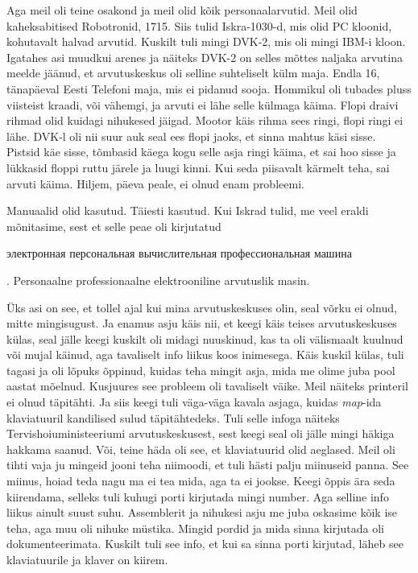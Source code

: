 Aga meil oli teine osakond ja meil olid kõik personaalarvutid. Meil olid 
kaheksabitised Robotronid, 1715. Siis tulid 
Iskra-1030-d, mis olid PC kloonid, kohutavalt halvad 
arvutid. Kuskilt tuli mingi DVK-2, mis oli mingi IBM-i kloon. 
Igatahes asi muudkui arenes ja näiteks DVK-2 on selles mõttes naljaka arvutina 
meelde jäänud, et arvutuskeskus oli selline suhteliselt külm maja. Endla 16, 
tänapäeval Eesti Telefoni maja, mis ei pidanud sooja. Hommikul oli tubades pluss viisteist kraadi, või 
vähemgi, ja arvuti ei lähe selle külmaga käima. Flopi draivi rihmad olid 
kuidagi nihukesed jäigad. Mootor käis rihma sees ringi, flopi ringi ei lähe. 
DVK-l oli nii suur auk seal ees flopi jaoks, et sinna mahtus käsi sisse. 
Pistsid käe sisse, tõmbasid käega kogu selle asja ringi käima, et sai hoo sisse 
ja lükkasid floppi ruttu järele ja luugi kinni. Kui seda piisavalt kärmelt 
teha, sai arvuti käima. Hiljem, päeva peale, ei olnud enam probleemi. 


Manuaalid olid kasutud. Täiesti kasutud. Kui Iskrad 
tulid, me  veel eraldi mõnitasime, sest et selle peae oli kirjutatud 
\begin{russian}электронная персональная вычислительная профессиональная 
машина\end{russian}. Personaalne professionaalne elektrooniline arvutuslik 
masin. 


Üks asi on see, et tollel ajal kui mina arvutuskeskuses olin, seal võrku ei 
olnud, mitte mingisugust. Ja enamus asju käis nii, et keegi käis teises 
arvutuskeskuses külas, seal jälle keegi kuskilt oli midagi nuuskinud, kas ta 
oli välismaalt kuulnud või mujal käinud, aga tavaliselt info liikus koos 
inimesega. Käis kuskil külas,  tuli tagasi ja  oli lõpuks õppinud, kuidas teha 
mingit asja, mida me olime juba pool aastat mõelnud. Kusjuures see probleem oli 
tavaliselt väike. Meil näiteks printeril ei olnud täpitähti. Ja siis keegi tuli 
väga-väga kavala asjaga, kuidas \emph{map}-ida  klaviatuuril kandilised sulud 
täpitähtedeks. Tuli selle infoga  näiteks Tervishoiuministeeriumi 
arvutuskeskusest, sest keegi seal oli jälle mingi häkiga hakkama saanud. Või, 
teine häda oli see, et klaviatuurid olid aeglased. Meil oli tihti vaja ju 
mingeid jooni teha niimoodi, et tuli hästi palju miinuseid panna. See miinus, 
hoiad teda  nagu ma ei tea mida, aga ta ei jookse. Keegi õppis ära seda 
kiirendama, selleks tuli kuhugi porti kirjutada mingi number. Aga selline info 
liikus ainult suust suhu. Assemblerit ja nihukesi asju me juba 
oskasime kõik ise teha, aga muu oli nihuke müstika. Mingid pordid ja mida sinna 
kirjutada oli dokumenteerimata. Kuskilt tuli see info, et kui sa sinna porti 
kirjutad, läheb see klaviatuurile ja klaver on kiirem. 

